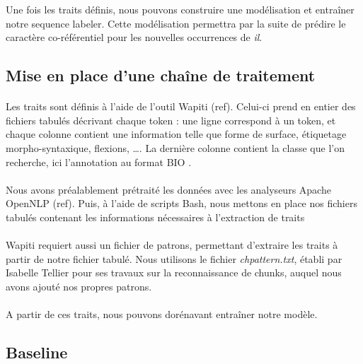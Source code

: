 \documentclass[a4paper,12pt]{article}
\begin{document}
Une fois les traits définis, nous pouvons construire une modélisation et entraîner notre sequence labeler. Cette modélisation permettra par la suite de prédire le caractère co-référentiel pour les nouvelles occurrences de \og{}\textit{il}\fg{}.


\subsection{Mise en place d'une chaîne de traitement}

\paragraph{}
Les traits sont définis à l'aide de l'outil Wapiti (ref). Celui-ci prend en entier des fichiers tabulés décrivant chaque token : une ligne correspond à un token, et chaque colonne contient une information telle que forme de surface, étiquetage morpho-syntaxique, flexions, \ldots. La dernière colonne contient la classe que l'on recherche, ici l'annotation au format BIO .

\paragraph{}
Nous avons préalablement prétraité les données avec les analyseurs Apache OpenNLP (ref). Puis, à l'aide de scripts Bash, nous mettons en place nos fichiers tabulés contenant les informations nécessaires à l'extraction de traits

\paragraph{}
Wapiti requiert aussi un fichier de patrons, permettant d'extraire les traits à partir de notre fichier tabulé. Nous utilisons le fichier \emph{chpattern.txt}, établi par Isabelle Tellier pour ses travaux sur la reconnaissance de chunks, auquel nous avons ajouté nos propres patrons.

\paragraph{}
A partir de ces traits, nous pouvons dorénavant entraîner notre modèle.


\subsection{Baseline}
\end{document}
